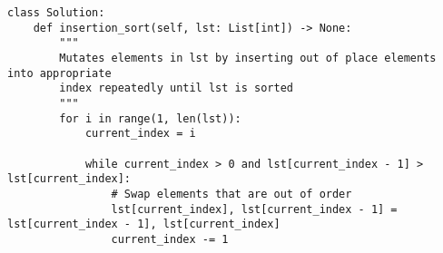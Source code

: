 \begin{lstlisting}
class Solution:
    def insertion_sort(self, lst: List[int]) -> None:
        """
        Mutates elements in lst by inserting out of place elements into appropriate
        index repeatedly until lst is sorted
        """
        for i in range(1, len(lst)):
            current_index = i

            while current_index > 0 and lst[current_index - 1] > lst[current_index]:
                # Swap elements that are out of order
                lst[current_index], lst[current_index - 1] = lst[current_index - 1], lst[current_index]
                current_index -= 1
\end{lstlisting}


